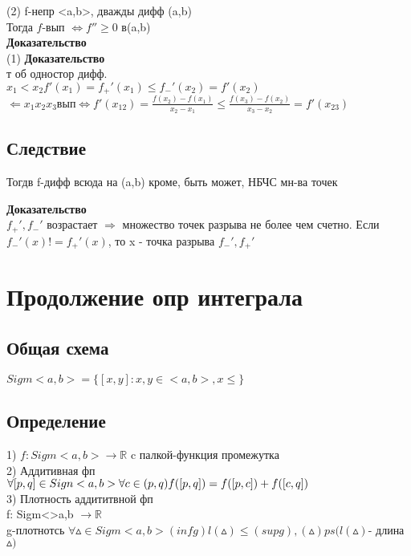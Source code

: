 ﻿\documentclass[12pt, a4paper]{article}
\begin{document}
  (2) f-непр <a,b>, дважды дифф (a,b) \\
  Тогда $f$-вып  $\Longleftrightarrow f'' \geq 0$ в(a,b) \\
  
    \textbf{Доказательство} \\
    (1)   \textbf{Доказательство} \\ т об одностор дифф. \\
  $ x_1<x_2 f'(x_1)=f_+'(x_1)\leq  f_-'(x_2)=f'(x_2)$ \\
  $ \Leftarrow x_1 x_2 x_3 вып \Longleftrightarrow   f'(x_{12})=\frac{f(x_2)-f(x_1)}{x_2-x_1} \leq  \frac{f(x_3)-f(x_2)}{x_3-x_2}=f'(x_{23})$ \\
   
    \subsection{Следствие}
    Тогдв f-дифф всюда на (a,b) кроме, быть может,  НБЧС  мн-ва точек
    
     \textbf{Доказательство} \\
    $f_+', f_-'$ возрастает $\Rightarrow$ множество точек разрыва не более чем счетно. Если $f_-'(x) != f_+'(x)$, то x - точка разрыва  $f_-',f_+'$ \\
     
\section{Продолжение опр интеграла}
    
    \subsection{Общая схема}
    
    $Sigm<a,b> = \lbrace[x,y]:x,y \in <a,b>,x\leq \rbrace$ \\
    
     \subsection{Определение}
     1) $f: Sigm<a,b> \rightarrow \mathbb{R}$ c палкой-функция промежутка \\
     2) Аддитивная фп \\
      $\forall [p,q] \in Sign<a,b> \forall c \in(p,q) \\
     f([p,q])= f([p,c])+f([c,q])$\\
     3) Плотность аддититвной фп \\
     f: Sigm<>a,b $\rightarrow \mathbb{R}$\\
     g-плотнотсь $\forall \vartriangle \in Sigm <a,b> (inf g)l(\vartriangle)\leq(sup g ) ,(\vartriangle) ps(l(\vartriangle)$- длина $\vartriangle)$\\
     
\end{document}
